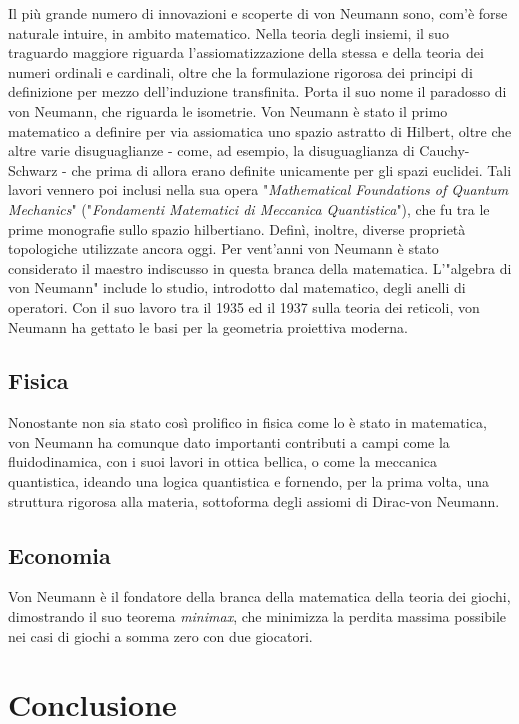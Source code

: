 \documentclass[a4paper, 12pt]{article}
\begin{document}
Il più grande numero di innovazioni e scoperte di von Neumann sono, com'è forse naturale intuire, in ambito matematico. Nella teoria degli insiemi, il suo traguardo maggiore riguarda l'assiomatizzazione della stessa e della teoria dei numeri ordinali e cardinali, oltre che la formulazione rigorosa dei principi di definizione per mezzo dell'induzione transfinita. Porta il suo nome il paradosso di von Neumann, che riguarda le isometrie.
Von Neumann è stato il primo matematico a definire per via assiomatica uno spazio astratto di Hilbert, oltre che altre varie disuguaglianze - come, ad esempio, la disuguaglianza di Cauchy-Schwarz - che prima di allora erano definite unicamente per gli spazi euclidei. Tali lavori vennero poi inclusi nella sua opera "\textit{Mathematical Foundations of Quantum Mechanics}" ("\textit{Fondamenti Matematici di Meccanica Quantistica}"), che fu tra le prime monografie sullo spazio hilbertiano. Definì, inoltre, diverse proprietà topologiche utilizzate ancora oggi. Per vent'anni von Neumann è stato considerato il maestro indiscusso in questa branca della matematica. 
L'"algebra di von Neumann" include lo studio, introdotto dal matematico, degli anelli di operatori.
Con il suo lavoro tra il 1935 ed il 1937 sulla teoria dei reticoli, von Neumann ha gettato le basi per la geometria proiettiva moderna.

\subsection{Fisica}
Nonostante non sia stato così prolifico in fisica come lo è stato in matematica, von Neumann ha comunque dato importanti contributi a campi come la fluidodinamica, con i suoi lavori in ottica bellica, o come la meccanica quantistica, ideando una logica quantistica e fornendo, per la prima volta, una struttura rigorosa alla materia, sottoforma degli assiomi di Dirac-von Neumann.



\subsection{Economia}
Von Neumann è il fondatore della branca della matematica della teoria dei giochi, dimostrando il suo teorema \textit{minimax}, che minimizza la perdita massima possibile nei casi di giochi a somma zero con due giocatori.


\section{Conclusione}
\end{document}
